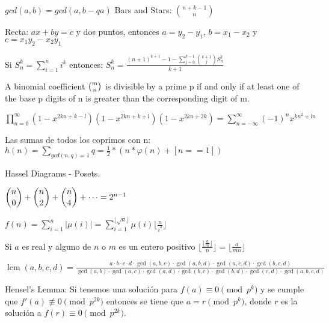 {\normalsize
    $ gcd(a,b) = gcd(a, b-qa)$
    \hspace{4em} Bars and Stars: $ \binom{n+k-1}{n} $
    
    Recta: $ax + by = c$ y dos puntos, entonces $a = y_2-y_1$, $b = x_1-x_2$ y $c = x_1y_2-x_2y_1$
    
    Si $S_{n}^{k} = \sum_{i=1}^{n} i^k$ entonces: $S_{n}^{k} = \frac{ (n+1)^{k+1} - 1 - \sum_{j=0}^{k-1} {{k+1} \choose j} S_n^j }{ k+1 }$

    A binomial coefficient ${\tbinom {m}{n}}$ is divisible by a prime p if and only if at least one of the base p digits of n is greater than the corresponding digit of m.

    $\displaystyle\prod_{n=0}^{\infty} (1-x^{2kn+k-l})(1-x^{2kn+k+l})(1-x^{2kn+2k}) = \displaystyle\sum_{n=-\infty}^{\infty}(-1)^nx^{kn^2+ln}$

    Las sumas de todos los coprimos con n: $\displaystyle h(n) = \sum_{gcd(n,q)=1} q = \frac{1}{2} * (n  * \varphi(n) + [n==1])$

    Hassel Diagrams - Posets.

    $\dbinom n 0 + \dbinom n 2 + \dbinom n 4 + \dotsb = 2^{n - 1}$

    $\displaystyle f(n) = \sum_{i=1}^{n} |\mu(i)| = \sum_{i=1}^{  \lfloor \sqrt{n} \rfloor} \mu(i) \lfloor \frac{n}{i^2} \rfloor$

    Si $a$ es real y alguno de $n$ o $m$ es un entero positivo $\displaystyle \lfloor \frac{\lfloor \frac{a}{m} \rfloor }{n} \rfloor = \lfloor \frac{a}{mn} \rfloor$

    $ \operatorname{lcm}(a,b,c,d)=\frac{a\cdot b\cdot c\cdot d\cdot\operatorname{gcd}(a,b,c)\cdot\operatorname{gcd}(a,b,d)\cdot\operatorname{gcd}(a,c,d)\cdot\operatorname{gcd}(b,c,d)}{\operatorname{gcd}(a,b)\cdot\operatorname{gcd}(a,c)\cdot\operatorname{gcd}(a,d)\cdot\operatorname{gcd}(b,c)\cdot\operatorname{gcd}(b,d)\cdot\operatorname{gcd}(c,d)\cdot\operatorname{gcd}(a,b,c,d)} $

    Hensel's Lemma: Si tenemos una solución para $f(a) \equiv 0 \pmod{p^k}$ y se cumple que $f'(a) \not\equiv 0 \pmod{p^{2k}}$ entonces se tiene que $a = r \pmod{p^k}$, donde $r$ es la solución a $f(r) \equiv 0 \pmod{p^{2k}}$.
}